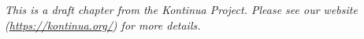 
\hrulefill

\textit{This is a draft chapter from the Kontinua Project. Please see our website (\url{https://kontinua.org/}) for more details.}

